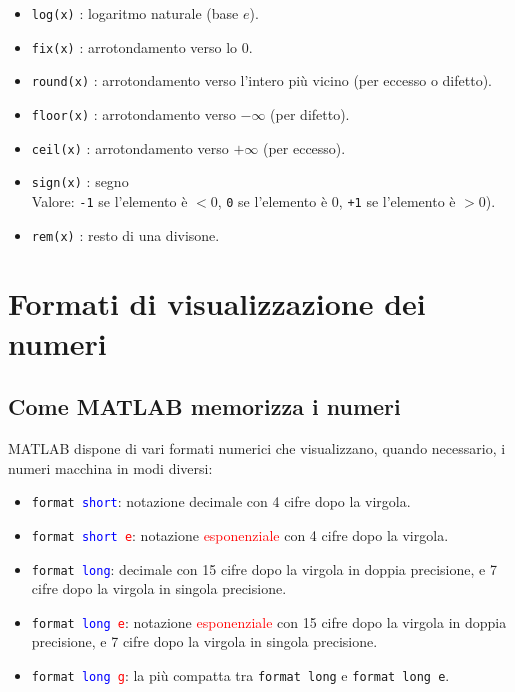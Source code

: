 \documentclass[12pt,a4paper,oneside]{book}
\begin{document}
\begin{itemize}
	\item	\texttt{log(x)} : logaritmo naturale (base $e$).
	
	\item	\texttt{fix(x)} : arrotondamento verso lo 0.
	
	\item	\texttt{round(x)} : arrotondamento verso l'intero più vicino (per eccesso o difetto).
	
	\item	\texttt{floor(x)} : arrotondamento verso $-\infty$ (per difetto).
	
	\item	\texttt{ceil(x)} : arrotondamento verso $+\infty$ (per eccesso).
	
	\item	\texttt{sign(x)} : segno \\ 
	Valore: \texttt{-1} se l'elemento è $< 0$,  \texttt{0} se l'elemento è $0$,  \texttt{+1} se l'elemento è $> 
	0$).
	
	\item	\texttt{rem(x)} : resto di una divisone.

\end{itemize}

\newpage

\chapter{Formati di visualizzazione dei numeri}
\section{Come MATLAB memorizza i numeri}
MATLAB dispone di vari formati numerici che visualizzano, quando necessario, i numeri macchina in modi diversi:
\begin{itemize}

	\item	\texttt{format \textcolor{blue}{short}}: notazione decimale con 4 cifre dopo la virgola.
	
	\item	\texttt{format \textcolor{blue}{short} \textcolor{red}{e}}: notazione \textcolor{red}{esponenziale} 
			con 4 cifre dopo la virgola.
			
	\item	\texttt{format \textcolor{blue}{long}}: decimale con 15 cifre dopo la virgola in doppia precisione, e 
			7 cifre dopo la virgola in singola precisione.
			
	\item	\texttt{format \textcolor{blue}{long} \textcolor{red}{e}}: notazione \textcolor{red}{esponenziale} 
			con 15 cifre dopo la virgola in doppia precisione, e 7 cifre dopo la virgola in singola precisione.
			
	\item	\texttt{format \textcolor{blue}{long} \textcolor{red}{g}}: la più compatta tra \texttt{format long} e 
			\texttt{format long e}.

\end{itemize}
\end{document}
